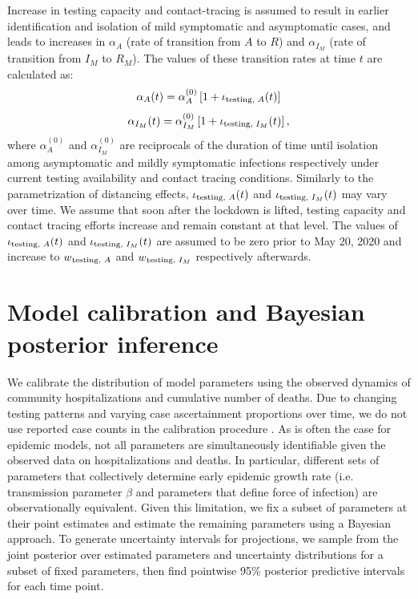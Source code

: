 \documentclass[11pt]{article}
\begin{document}
Increase in testing capacity and contact-tracing is assumed to result in earlier identification and isolation of mild symptomatic and asymptomatic cases, and leads to increases in $\alpha_A$ (rate of transition from $A$ to $R$) and $\alpha_{I_M}$ (rate of transition from $I_M$ to $R_M$). The values of these transition rates at time $t$ are calculated as:
\[ \alpha_A(t) = \alpha_A^{(0)} \left[ 1 + \iota\textsubscript{testing, $A$} (t) \right] \]
\[ \alpha_{I_M}(t) = \alpha_{I_M}^{(0)} \left[ 1 + \iota\textsubscript{testing, $I_M$} (t) \right], \]
where $\alpha_A^{(0)}$ and $\alpha_{I_M}^{(0)}$ are reciprocals of the duration of time until isolation among asymptomatic and mildly symptomatic infections respectively under current testing availability and contact tracing conditions. Similarly to the parametrization of distancing effects, $\iota\textsubscript{testing, $A$} (t)$ and $\iota\textsubscript{testing, $I_M$} (t)$ may vary over time. 
We assume that soon after the lockdown is lifted, testing capacity and contact tracing efforts increase and remain constant at that level. The values of $\iota\textsubscript{testing, $A$} (t)$ and $\iota\textsubscript{testing, $I_M$} (t)$ are assumed to be zero prior to May 20, 2020 and increase to $w\textsubscript{testing, $A$}$ and $w\textsubscript{testing, $I_M$}$ respectively afterwards.  





\section{Model calibration and Bayesian posterior inference}


We calibrate the distribution of model parameters using the observed dynamics of community hospitalizations and cumulative number of deaths.  Due to changing testing patterns and varying case ascertainment proportions over time, we do not use reported case counts in the calibration procedure \citep{holmdahl2020wrong, pitzer2020impact}.  As is often the case for epidemic models, not all parameters are simultaneously identifiable given the observed data on hospitalizations and deaths.  In particular, different sets of parameters that collectively determine early epidemic growth rate (i.e. transmission parameter $\beta$ and parameters that define force of infection) are observationally equivalent. Given this limitation, we fix a subset of parameters at their point estimates and estimate the remaining parameters using a Bayesian approach.  To generate uncertainty intervals for projections, we sample from the joint posterior over estimated parameters and uncertainty distributions for a subset of fixed parameters, then find pointwise 95\% posterior predictive intervals for each time point. 
\end{document}
